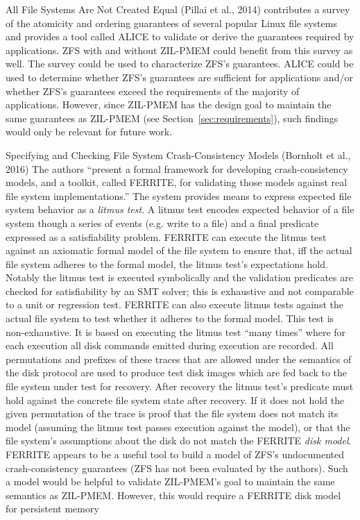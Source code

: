 \documentclass[12pt,a4paper,twoside,draft]{book}
\begin{document}
All File Systems Are Not Created Equal (Pillai et al., 2014) contributes a survey of the atomicity and ordering guarantees of several popular Linux file systems and provides a tool called ALICE to validate or derive the guarantees required by applications.
ZFS with and without ZIL-PMEM could benefit from this survey as well.
The survey could be used to characterize ZFS’s guarantees.
ALICE could be used to determine whether ZFS’s guarantees are sufficient for applications and/or whether ZFS’s guarantees exceed the requirements of the majority of applications.
However, since ZIL-PMEM has the design goal to maintain the same guarantees as ZIL-PMEM (see Section~\ref{sec:requirements}), such findings would only be relevant for future work.

Specifying and Checking File System Crash-Consistency Models (Bornholt et al., 2016)
The authors
  “present a formal framework for developing crash-consistency models, and a toolkit, called FERRITE, for validating those models against real file system implementations.”
The system provides means to express expected file system behavior as a \textit{litmus test}.
A litmus test encodes expected behavior of a file system though a series of events (e.g. write to a file) and a final predicate expressed as a satisfiability problem.
FERRITE can execute the litmus test against an axiomatic formal model of the file system to ensure that, iff the actual file system adheres to the formal model, the litmus test’s expectations hold.
Notably the litmus test is executed symbolically and the validation predicates are checked for satisfiability by an SMT solver; this is exhaustive and not comparable to a unit  or regression test.
FERRITE can also execute litmus tests against the actual file system to test whether it adheres to the formal model.
This test is non-exhaustive.
It is based on executing the litmus test “many times” where for each execution all disk commands emitted during execution are recorded.
All permutations and prefixes of these traces that are allowed under the semantics of the disk protocol are used to produce test disk images which are fed back to the file system under test for recovery.
After recovery the litmus test’s predicate must hold against the concrete file system state after recovery.
If it does not hold the given permutation of the trace is proof that the file system does not match its model (assuming the litmus test passes execution against the model), or that the file system’s assumptions about the disk do not match the FERRITE \textit{disk model}.
FERRITE appears to be a useful tool to build a model of ZFS’s undocumented crash-consistency guarantees (ZFS has not been evaluated by the authors).
Such a model would be helpful to validate ZIL-PMEM's goal to maintain the same semantics as ZIL-PMEM.
However, this would require a FERRITE disk model for persistent memory
\end{document}
